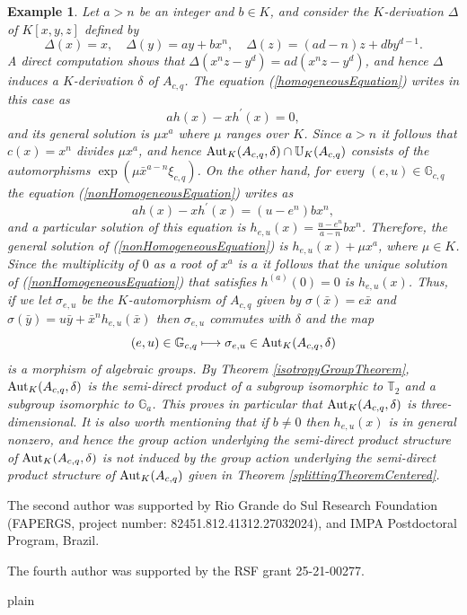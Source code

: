 \documentclass{article}
\newcommand \G {\mathbb{G}}
\newcommand \T {\mathbb{T}}
\renewcommand \a {A}
\renewcommand \k {K}
\newcommand \saut {{\rm \mathbb{U}}}
\newcommand \auto {{\rm Aut}}
\newtheorem{example}[theorem]{Example}
\begin{document}
{\begin{example}
	\medskip Let $a>n$ be an integer and $b\in\k$, and consider the $\k$-derivation $\Delta$ of $\k[x,y,z]$ defined by $$\Delta(x)=x,\quad \Delta(y)=ay+bx^n,\quad \Delta(z)=(ad-n)z+dby^{d-1}.$$ A direct computation shows that $\Delta(x^nz-y^d)=ad(x^nz-y^d)$, and hence $\Delta$ induces a $\k$-derivation $\delta$ of $\a_{c,q}$. The equation (\ref{homogeneousEquation}) writes in this case as $$ah(x)-xh^{\prime}(x)=0,$$ and its general solution is $\mu x^a$ where $\mu$ ranges over $\k$. Since $a>n$ it follows that $c(x)=x^n$ divides $\mu x^a$, and hence $\auto_{\k}(\a_{c,q},\delta)\cap \saut_{\k}(\a_{c,q})$ consists of the automorphisms $\exp(\mu\bar{x}^{a-n}\xi_{c,q})$. On the other hand, for every $(e,u)\in \G_{c,q}$ the equation (\ref{nonHomogeneousEquation}) writes as $$ah(x)-xh^{\prime}(x)=(u-e^n)bx^n,$$ and a particular solution of this equation is $h_{e,u}(x)=\frac{u-e^n}{a-n}bx^n$. Therefore, the general solution of (\ref{nonHomogeneousEquation}) is $h_{e,u}(x)+\mu x^a$, where $\mu\in\k$. Since the multiplicity of $0$ as a root of $x^a$ is $a$ it follows that the unique solution of (\ref{nonHomogeneousEquation}) that satisfies $h^{(a)}(0)=0$ is $h_{e,u}(x)$. Thus, if we let $\sigma_{e,u}$ be the $\k$-automorphism of $\a_{c,q}$ given by $\sigma(\bar{x})=e\bar{x}$ and $\sigma(\bar{y})=u\bar{y}+\bar{x}^nh_{e,u}(\bar{x})$ then $\sigma_{e,u}$ commutes with $\delta$ and the map $$(e,u)\in\G_{c,q}\longmapsto \sigma_{e,u}\in \auto_{\k}(\a_{c,q},\delta)$$ is a morphism of algebraic groups. By Theorem \ref{isotropyGroupTheorem}, $\auto_{\k}(\a_{c,q},\delta)$ is the semi-direct product of a subgroup isomorphic to $\T_2$ and a subgroup isomorphic to $\G_a$. This proves in particular that $\auto_{\k}(\a_{c,q},\delta)$ is three-dimensional. It is also worth mentioning that if $b\neq 0$ then $h_{e,u}(x)$ is in general nonzero, and hence the group action underlying the semi-direct product structure of $\auto_{\k}(\a_{c,q},\delta)$ is not induced by the group action underlying the semi-direct product structure of $\auto_{\k}(\a_{c,q})$ given in Theorem \ref{splittingTheoremCentered}.
\end{example}

\bigskip {} The second author was supported by Rio Grande do Sul Research Foundation (FAPERGS, project number: 82451.812.41312.27032024), and IMPA Postdoctoral Program, Brazil.

\smallskip \noindent The fourth author was supported by the RSF grant 25-21-00277.


 \begin{thebibliography}{plain}


\end{thebibliography}}
\end{document}
